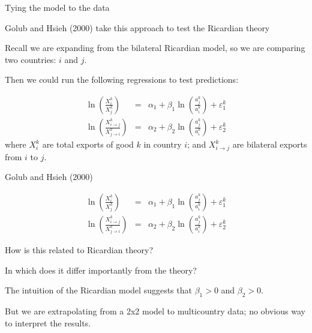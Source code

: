 \documentclass[notes,11pt, aspectratio=169, xcolor=table]{beamer}
\newenvironment{wideitemize}{\itemize\addtolength{\itemsep}{10pt}}{\enditemize}
\begin{document}
\begin{frame}{Tying the model to the data}

\begin{wideitemize}
    \item<1-> Golub and Hsieh (2000) take this approach to test the Ricardian theory

    \item<2-> Recall we are expanding from the bilateral Ricardian model, so we are comparing two countries: $i$ and $j$.

    \item<3-> Then we could run the following regressions to test predictions:

    \begin{eqnarray*}
        \ln \left( \frac{X_{i}^k}{X_{j}^k} \right) &=& \alpha_1 + \beta_1 \ln \left(\frac{a_{j}^k}{a_{i}^k} \right) + \varepsilon_1^k \\
        \ln \left( \frac{X_{i\to j}^k}{X_{j \to i}^k} \right) &=& \alpha_2 + \beta_2 \ln \left(\frac{a_{j}^k}{a_{i}^k} \right) + \varepsilon_2^k 
    \end{eqnarray*}
    where $X_{i}^k$ are total exports of good $k$ in country $i$; and $X_{i\to j}^k$ are bilateral exports from $i$ to $j$.
    
    
\end{wideitemize}

    
\end{frame}

\begin{frame}{Golub and Hsieh (2000)}

    \begin{eqnarray*}
        \ln \left( \frac{X_{i}^k}{X_{j}^k} \right) &=& \alpha_1 + \beta_1 \ln \left(\frac{a_{j}^k}{a_{i}^k} \right) + \varepsilon_1^k \\
        \ln \left( \frac{X_{i\to j}^k}{X_{j \to i}^k} \right) &=& \alpha_2 + \beta_2 \ln \left(\frac{a_{j}^k}{a_{i}^k} \right) + \varepsilon_2^k 
    \end{eqnarray*}
    
    \begin{wideitemize}

    \item<1-> How is this related to Ricardian theory?

    \item<2-> In which does it differ importantly from the theory?

    \item<3-> The intuition of the Ricardian model suggests that $\beta_1 > 0$ and $\beta_2 > 0$.
    
    \item<4-> But we are extrapolating from a 2x2 model to multicountry data; no obvious way to interpret the results.

\end{wideitemize}

\end{frame}
\end{document}
